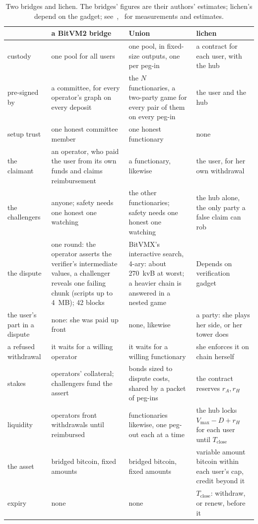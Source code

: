 \documentclass[11pt]{article}
\newcommand{\vmax}{V_{\max}}
\newcommand{\Tc}{T_{\mathrm{close}}}
\begin{document}
\begin{table}[!tp]
\centering
\small
\begin{tabularx}{\linewidth}{>{\raggedright\arraybackslash}p{21mm}LLL}
\toprule
& a BitVM2 bridge & Union & lichen \\
\midrule
custody & one pool for all users & one pool, in fixed-size outputs, one per peg-in & a contract for each user, with the hub \\
pre-signed by & a committee, for every operator's graph on every deposit & the $N$ functionaries, a two-party game for every pair of them on every peg-in & the user and the hub \\
setup trust & one honest committee member & one honest functionary & none \\
the claimant & an operator, who paid the user from its own funds and claims reimbursement & a functionary, likewise & the user, for her own withdrawal \\
the challengers & anyone; safety needs one honest one watching & the other functionaries; safety needs one honest one watching & the hub alone, the only party a false claim can rob \\
the dispute & one round: the operator asserts the verifier's intermediate values, a challenger reveals one failing chunk (scripts up to 4~MB); 42 blocks & BitVMX's interactive search, 4-ary: about 270~kvB at worst; a heavier chain is answered in a nested game & Depends on verification gadget \\
the user's part in a dispute & none: she was paid up front & none, likewise & a party: she plays her side, or her tower does \\
a refused withdrawal & it waits for a willing operator & it waits for a willing functionary & she enforces it on chain herself \\
stakes & operators' collateral; challengers fund the assert & bonds sized to dispute costs, shared by a packet of peg-ins & the contract reserves $r_A, r_H$ \\
liquidity & operators front withdrawals until reimbursed & functionaries likewise, one peg-out each at a time & the hub locks $\vmax - D + r_H$ for each user until $\Tc$ \\
the asset & bridged bitcoin, fixed amounts & bridged bitcoin, fixed amounts & variable amount bitcoin within each user's cap, credit beyond it \\
expiry & none & none & $\Tc$: withdraw, or renew, before it \\
\bottomrule
\end{tabularx}
\caption{Two bridges and lichen. The bridges' figures are their
authors' estimates; lichen's depend on the gadget; see~\cite{lichenbitvmx},~\cite{lichenbabe} for measurements and estimates.}
\label{tab:bitvm2}
\end{table}
\end{document}
